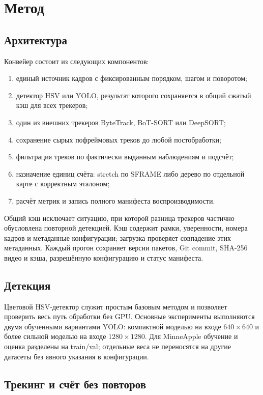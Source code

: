 \documentclass[12pt,a4paper]{article}
\begin{document}
\section{Метод}

\subsection{Архитектура}

Конвейер состоит из следующих компонентов:
\begin{enumerate}
  \item единый источник кадров с фиксированным порядком, шагом и поворотом;
  \item детектор HSV или YOLO, результат которого сохраняется в общий
        сжатый кэш для всех трекеров;
  \item один из внешних трекеров ByteTrack, BoT-SORT или DeepSORT;
  \item сохранение сырых пофреймовых треков до любой постобработки;
  \item фильтрация треков по фактически выданным наблюдениям и подсчёт;
  \item назначение единиц счёта: stretch по SFRAME либо дерево по отдельной
        карте с корректным эталоном;
  \item расчёт метрик и запись полного манифеста воспроизводимости.
\end{enumerate}

Общий кэш исключает ситуацию, при которой разница трекеров частично
обусловлена повторной детекцией. Кэш содержит рамки, уверенности, номера
кадров и метаданные конфигурации; загрузка проверяет совпадение этих
метаданных. Каждый прогон сохраняет версии пакетов, Git commit, SHA-256
видео и кэша, разрешённую конфигурацию и статус манифеста.

\subsection{Детекция}

Цветовой HSV-детектор служит простым базовым методом и позволяет проверить
весь путь обработки без GPU. Основные эксперименты выполняются двумя
обученными вариантами YOLO: компактной моделью на входе $640\times640$ и
более сильной моделью на входе $1280\times1280$. Для MinneApple обучение и
оценка разделены на train/val; отдельные веса не переносятся на другие
датасеты без явного указания в конфигурации.

\subsection{Трекинг и счёт без повторов}
\end{document}
